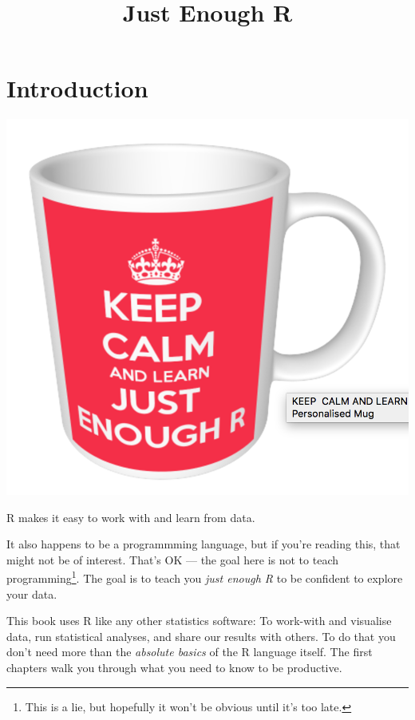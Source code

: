 \documentclass[]{article}
\title{Just Enough R}
\author{}
\date{}
\let\rmarkdownfootnote\footnote%
\def\footnote{\protect\rmarkdownfootnote}
\begin{document}
\maketitle

{
\setcounter{tocdepth}{2}
\tableofcontents
}
\hypertarget{introduction}{%
\section*{Introduction}\label{introduction}}

\includegraphics{media/keepcalm.png}

R makes it easy to work with and learn from data.

It also happens to be a programmming language, but if you're reading this, that
might not be of interest. That's OK --- the goal here is not to teach
programming\footnote{This is a lie, but hopefully it won't be obvious until it's too
  late.}. The goal is to teach you \emph{just enough R} to be confident to explore your
data.

This book uses R like any other statistics software: To work-with and visualise
data, run statistical analyses, and share our results with others. To do that
you don't need more than the \emph{absolute basics} of the R language itself. The
first chapters walk you through what you need to know to be productive.
\end{document}
